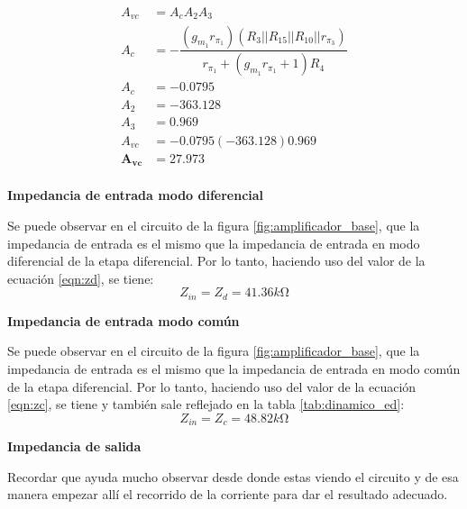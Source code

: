 \begin{enumerate}
\begin{itemize}
                \begin{align*}
                  A_{vc}          & =A_cA_2A_3                                                                                        \\[1cm]
                  A_c             & =-\dfrac{(g_{m_1}r_{\pi_1})(R_{3}||R_{15}||R_{10}||r_{\pi_3})}{r_{\pi_1}+(g_{m_1}r_{\pi_1}+1)R_4} \\[0.2cm]
                  A_c             & =-0.0795                                                                                          \\[1cm]
                  A_2             & =-363.128                                                                                         \\[1cm]
                  A_3             & =0.969                                                                                            \\[1cm]
                  A_{vc}          & =-0.0795 (-363.128 )0.969                                                                         \\[0.2cm]
                  \mathbf{A_{vc}} & =\mathbf{27.973}                                                                                  \\[0.2cm]
                \end{align*}

        \end{itemize}
        \textbf{Impedancia de entrada modo diferencial}

        Se puede observar en el circuito de la figura \ref{fig:amplificador_base}, que la impedancia de entrada es el mismo que la impedancia de entrada en modo diferencial de la etapa diferencial. Por lo tanto, haciendo uso del valor de la ecuación \ref{eqn:zd}, se tiene:
        $$Z_{in}=Z_d=41.36k\si{\ohm}$$



        \textbf{Impedancia de entrada modo común}

        Se puede observar en el circuito de la figura \ref{fig:amplificador_base}, que la impedancia de entrada es el mismo que la impedancia de entrada en modo común de la etapa diferencial. Por lo tanto, haciendo uso del valor de la ecuación \ref{eqn:zc}, se tiene y también sale reflejado en la tabla \ref{tab:dinamico_ed}:
        $$Z_{in}=Z_c=48.82k\si{\ohm}$$

        \textbf{Impedancia de salida}

        Recordar que ayuda mucho observar desde donde estas viendo el circuito y de esa manera empezar allí el recorrido de la corriente para dar el resultado adecuado.


\end{enumerate}
